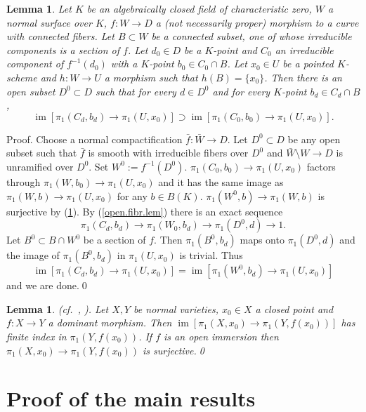 \documentclass[12pt,twoside]{amsart}
\newcommand{\im}[0]{\operatorname{im}}
\newtheorem{lem}[thm]{Lemma}
\theoremstyle{definition}
\theoremstyle{remark}
\begin{document}
\begin{lem} \label{fg.uppsem.lem}
 Let $K$ be an algebraically closed 
 field of characteristic zero, $W$ a normal surface over $K$,
$f:W\to D$ a (not necessarily proper)
morphism to a curve with  connected fibers.
Let $B\subset W$ be  a connected subset, one of whose
 irreducible components is a
 section of $f$. Let $ d_0\in D$ be a $K$-point and $C_0$ an
   irreducible component of $ f^{-1}(d_0)$ with a
$K$-point $b_0\in C_0\cap B$. Let 
$x_0\in U$ be a pointed $K$-scheme and 
$h:W\to U$  a morphism such that
$h(B)=\{x_0\}$. Then there is an open subset $D^0\subset D$
such that for every $d\in D^0$ and for every $K$-point
$b_d\in C_d\cap B$, 
$$
\im[\pi_1(C_d,b_d)\to \pi_1(U,x_0)]\supset
\im[\pi_1(C_0,b_0)\to \pi_1(U,x_0)].
$$
\end{lem} 

Proof. Choose a normal compactification $\bar f:\bar W\to D$.
Let $D^0\subset D$ be any open subset such that
 $\bar f$ is smooth with  irreducible fibers over $D^0$ and
  $\bar W\setminus W\to D$ is unramified over $D^0$.
Set $W^0:=f^{-1}(D^0)$. 
$\pi_1(C_0,b_0)\to \pi_1(U,x_0)$ factors through
$\pi_1(W,b_0)\to \pi_1(U,x_0)$ and it has the same image as
$\pi_1(W,b)\to \pi_1(U,x_0)$ for any $b\in B(K)$. 
$\pi_1(W^0,b)\to\pi_1(W,b)$ is surjective by (\ref{maps.fund.grps}).
 By (\ref{open.fibr.lem})
there is an exact sequence
$$
\pi_1(C_d,b_d)\to \pi_1(W_0,b_d)\to \pi_1(D^0,d)\to 1.
$$
Let $B^0\subset B\cap W^0$ be a section
of $f$. Then $\pi_1(B^0,b_d)$ maps onto
$\pi_1(D^0,d)$ and the image of
$\pi_1(B^0,b_d)$ in $\pi_1(U,x_0)$ is trivial.
Thus 
$$
\im[\pi_1(C_d,b_d)\to \pi_1(U,x_0)]=
\im[\pi_1(W^0,b_d)\to \pi_1(U,x_0)]
$$
and we are done.\qed


\begin{lem}(cf.\ \cite[IX.5.6]{sga1}, \cite[1.3]{campana-twist}).
\label{maps.fund.grps}
Let $X,Y$ be  normal varieties, $x_0\in X$  a closed 
point  and $f:X\to Y$ a dominant morphism.
 Then $\im[\pi_1(X,x_0)\to \pi_1(Y,f(x_0))]$
has finite index in $\pi_1(Y,f(x_0))$. If $f$ is an open immersion
then $\pi_1(X,x_0)\to \pi_1(Y,f(x_0))$ is surjective.\qed
\end{lem}









\section{Proof of the main results}
\end{document}
